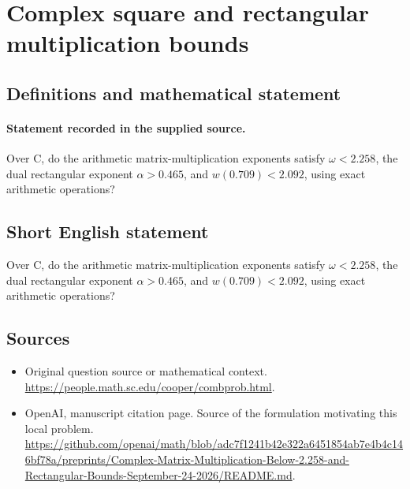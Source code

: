 \documentclass[11pt]{article}
\begin{document}
\section*{Complex square and rectangular multiplication bounds}\label{30007448}
\subsection{Definitions and mathematical statement}
\paragraph{Statement recorded in the supplied source.}
Over C, do the arithmetic matrix-multiplication exponents satisfy $\omega <2.258$, the dual rectangular exponent $\alpha >0.465$, and $w(0.709)<2.092$, using exact arithmetic operations?
\subsection{Short English statement}
Over C, do the arithmetic matrix-multiplication exponents satisfy $\omega <2.258$, the dual rectangular exponent $\alpha >0.465$, and $w(0.709)<2.092$, using exact arithmetic operations?
\subsection{Sources}
\begin{itemize}
\item[S1] Original question source or mathematical context.
\url{https://people.math.sc.edu/cooper/combprob.html}.
\item[S2] OpenAI, manuscript citation page. Source of the formulation motivating this local problem.
\url{https://github.com/openai/math/blob/adc7f1241b42e322a6451854ab7e4b4c146bf78a/preprints/Complex-Matrix-Multiplication-Below-2.258-and-Rectangular-Bounds-September-24-2026/README.md}.
\end{itemize}
\end{document}
